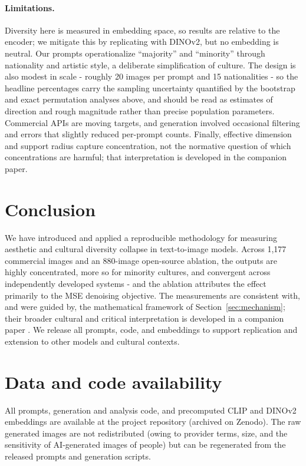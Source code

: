 \documentclass[11pt]{article}
\begin{document}
\paragraph{Limitations.} Diversity here is measured in embedding space, so results are relative to the encoder; we mitigate this by replicating with DINOv2, but no embedding is neutral. Our prompts operationalize ``majority'' and ``minority'' through nationality and artistic style, a deliberate simplification of culture. The design is also modest in scale - roughly 20 images per prompt and 15 nationalities - so the headline percentages carry the sampling uncertainty quantified by the bootstrap and exact permutation analyses above, and should be read as estimates of direction and rough magnitude rather than precise population parameters. Commercial APIs are moving targets, and generation involved occasional filtering and errors that slightly reduced per-prompt counts. Finally, effective dimension and support radius capture concentration, not the normative question of which concentrations are harmful; that interpretation is developed in the companion paper.

\section{Conclusion}

We have introduced and applied a reproducible methodology for measuring aesthetic and cultural diversity collapse in text-to-image models. Across 1,177 commercial images and an 880-image open-source ablation, the outputs are highly concentrated, more so for minority cultures, and convergent across independently developed systems - and the ablation attributes the effect primarily to the MSE denoising objective. The measurements are consistent with, and were guided by, the mathematical framework of Section~\ref{sec:mechanism}; their broader cultural and critical interpretation is developed in a companion paper \citep{Companion2026}. We release all prompts, code, and embeddings to support replication and extension to other models and cultural contexts.

\section*{Data and code availability}
All prompts, generation and analysis code, and precomputed CLIP and DINOv2 embeddings are available at the project repository (archived on Zenodo). %
The raw generated images are not redistributed (owing to provider terms, size, and the sensitivity of AI-generated images of people) but can be regenerated from the released prompts and generation scripts.
\end{document}
